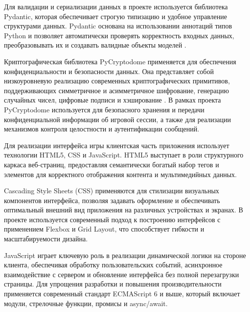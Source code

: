 Для валидации и сериализации данных в проекте используется библиотека Pydantic, которая обеспечивает строгую типизацию и удобное управление структурами данных. Pydantic основана на использовании аннотаций типов Python и позволяет автоматически проверять корректность входных данных, преобразовывать их и создавать валидные объекты моделей \cite{pydantic-api}.

Криптографическая библиотека PyCryptodome применяется для обеспечения конфиденциальности и безопасности данных. Она представляет собой низкоуровневую реализацию современных криптографических примитивов, поддерживающих симметричное и асимметричное шифрование, генерацию случайных чисел, цифровые подписи и хэширование \cite{pycryptodome-api}. В рамках проекта PyCryptodome используется для безопасного хранения и передачи конфиденциальной информации об игровой сессии, а также для реализации механизмов контроля целостности и аутентификации сообщений.

Для реализации интерфейса игры клиентская часть приложения использует технологии HTML5, CSS и JavaScript. HTML5 выступает в роли структурного каркаса веб-страниц, предоставляя семантически богатый набор тегов и элементов для корректного отображения контента и мультимедийных данных.

Cascading Style Sheets (CSS) применяются для стилизации визуальных компонентов интерфейса, позволяя задавать оформление и обеспечивать оптимальный внешний вид приложения на различных устройствах и экранах. В проекте используется современный подход к построению интерфейсов с применением Flexbox и Grid Layout, что способствует гибкости и масштабируемости дизайна.

JavaScript играет ключевую роль в реализации динамической логики на стороне клиента, обеспечивая обработку пользовательских событий, асинхронное взаимодействие с сервером и обновление интерфейса без полной перезагрузки страницы. Для упрощения разработки и повышения производительности применяется современный стандарт ECMAScript 6 и выше, который включает модули, стрелочные функции, промисы и async/await.
